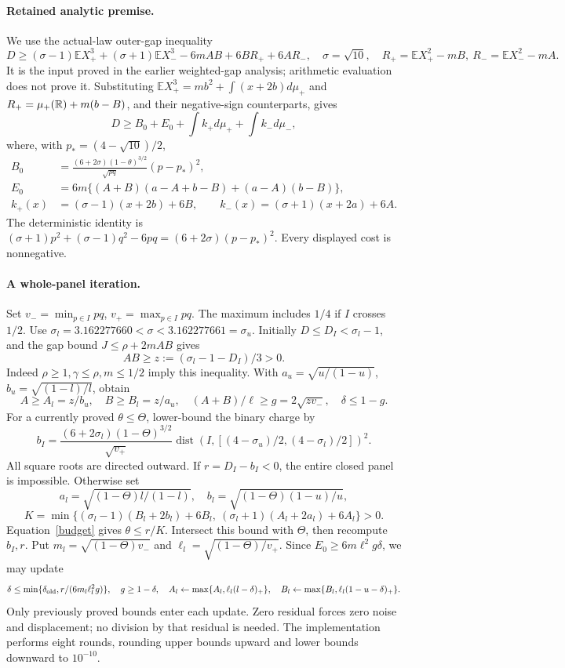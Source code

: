\documentclass[10pt]{article}
\newcommand{\E}{\mathbb E}\newcommand{\Pp}{\mathbb P}
\begin{document}
\paragraph{Retained analytic premise.}
We use the actual-law outer-gap inequality
\[
 D\ge(\sigma-1)\E X_+^3+(\sigma+1)\E X_-^3
       -6mAB+6BR_++6AR_-,
 \quad \sigma=\sqrt{10},\quad
 R_+=\E X_+^2-mB,\ R_-=\E X_-^2-mA.
\]
It is the input proved in the earlier weighted-gap analysis; arithmetic
evaluation does not prove it. Substituting
\(\E X_+^3=mb^2+\int(x+2b)d\mu_+\) and
\(R_+=\mu_+(\mathbb R)+m(b-B)\), and their negative-sign counterparts, gives
\begin{equation}\label{budget}
 D\ge B_0+E_0+\int k_+d\mu_++\int k_-d\mu_-,
\end{equation}
where, with \(p_*=(4-\sqrt{10})/2\),
\[
\begin{split}
 B_0&=\frac{(6+2\sigma)(1-\theta)^{3/2}}{\sqrt{pq}}(p-p_*)^2,\\
 E_0&=6m\{(A+B)(a-A+b-B)+(a-A)(b-B)\},\\
 k_+(x)&=(\sigma-1)(x+2b)+6B,\qquad
 k_-(x)=(\sigma+1)(x+2a)+6A .
\end{split}
\]
The deterministic identity is
\((\sigma+1)p^2+(\sigma-1)q^2-6pq=(6+2\sigma)(p-p_*)^2\).
Every displayed cost is nonnegative.

\paragraph{A whole-panel iteration.}
Set \(v_-=\min_{p\in I}pq\), \(v_+=\max_{p\in I}pq\).
The maximum includes \(1/4\) if \(I\) crosses \(1/2\).
Use \(\sigma_l=3.162277660<\sigma<3.162277661=\sigma_u\).
Initially \(D\le D_I<\sigma_l-1\), and the gap bound
\(J\le\rho+2mAB\) gives
\[
 AB\ge z:=(\sigma_l-1-D_I)/3>0.
\]
Indeed \(\rho\ge1,\gamma\le\rho,m\le1/2\) imply this inequality.
With \(a_u=\sqrt{u/(1-u)}\), \(b_u=\sqrt{(1-l)/l}\), obtain
\[
 A\ge A_l=z/b_u,\quad B\ge B_l=z/a_u,\quad
 (A+B)/\ell\ge g=2\sqrt{zv_-},\quad \delta\le1-g.
\]
For a currently proved \(\theta\le\Theta\), lower-bound the binary charge by
\[
 b_I=\frac{(6+2\sigma_l)(1-\Theta)^{3/2}}{\sqrt{v_+}}
        \operatorname{dist}(I,[ (4-\sigma_u)/2,(4-\sigma_l)/2])^2.
\]
All square roots are directed outward. If \(r=D_I-b_I<0\), the entire
closed panel is impossible. Otherwise set
\[
 a_l=\sqrt{(1-\Theta)l/(1-l)},\quad
 b_l=\sqrt{(1-\Theta)(1-u)/u},
\]
\[
 K=\min\{(\sigma_l-1)(B_l+2b_l)+6B_l,\
          (\sigma_l+1)(A_l+2a_l)+6A_l\}>0.
\]
Equation~\eqref{budget} gives \(\theta\le r/K\).
Intersect this bound with \(\Theta\), then recompute \(b_I,r\).
Put \(m_l=\sqrt{(1-\Theta)v_-}\) and
\(\ell_l=\sqrt{(1-\Theta)/v_+}\). Since
\(E_0\ge6m\ell^2g\delta\), we may update
\[
 \delta\le\min\{\delta_{\rm old},r/(6m_l\ell_l^2g)\},\quad
 g\ge1-\delta,\quad
 A_l\gets\max\{A_l,\ell_l(l-\delta)_+\},\quad
 B_l\gets\max\{B_l,\ell_l(1-u-\delta)_+\}.
\]
Only previously proved bounds enter each update. Zero residual forces
zero noise and displacement; no division by that residual is needed.
The implementation performs eight rounds, rounding upper bounds upward and
lower bounds downward to \(10^{-10}\).
\end{document}
